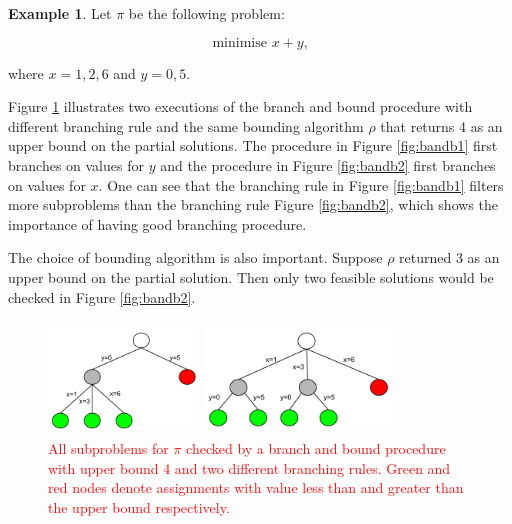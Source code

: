 \documentclass{mprop}
\theoremstyle{definition}
\newtheorem{example}{Example}
\begin{document}
\begin{example}
\label{ex:bandb}
\color{red}
Let $\pi$ be the following problem:

$$ \textrm{minimise } x + y \textrm{,}$$

where $x = 1, 2, 6$ and $y = 0, 5$.

Figure \ref{fig:bandb} illustrates two executions of the branch and bound procedure with different branching rule and the same bounding algorithm $\rho$ that returns 4 as an upper bound on the partial solutions. The procedure in Figure \ref{fig:bandb1} first branches on values for $y$ and the procedure in Figure \ref{fig:bandb2} first branches on values for $x$.
One can see that the branching rule in Figure \ref{fig:bandb1} filters more subproblems than the branching rule Figure \ref{fig:bandb2}, which shows the importance of having good branching procedure.

The choice of bounding algorithm is also important. Suppose $\rho$ returned 3 as an upper bound on the partial solution. Then only two feasible solutions would be checked in Figure \ref{fig:bandb2}.

\begin{figure}
\centering
\begin{minipage}{.5\textwidth}
\centering
\includegraphics[width=4cm, height=3cm]{images/bandb1.png}
\caption{Branching rule 1}
\label{fig:bandb1}
\end{minipage}%
\begin{minipage}{.5\textwidth}
\centering
\includegraphics[width=5cm, height=3cm]{images/bandb2.png}
\caption{Branching rule 2}
\label{fig:bandb2}
\end{minipage}
\caption{\textcolor{red}{All subproblems for $\pi$ checked by a branch and bound procedure with upper bound 4 and two different branching rules. Green and red nodes denote assignments with value less than and greater than the upper bound respectively.}}
\label{fig:bandb}
\end{figure}
\end{example}
\end{document}

